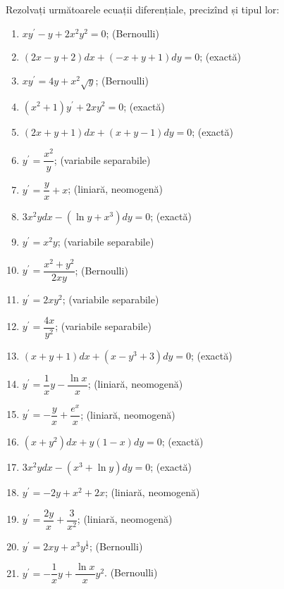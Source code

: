Rezolvați următoarele ecuații diferențiale, precizînd și tipul lor:
\begin{enumerate}[(1)]
  \item $xy^\prime - y + 2x^2 y^2 = 0 $; \hfill(Bernoulli)
  \item $(2x - y + 2) dx + (-x + y + 1) dy = 0 $; \hfill(exactă)
  \item $ xy^\prime = 4y + x^2 \sqrt{y} $; \hfill(Bernoulli)
  \item $ (x^2 + 1) y^\prime + 2xy^2 = 0 $; \hfill(exactă)
  \item $ (2x + y + 1) dx + (x + y - 1) dy = 0 $; \hfill(exactă)
  \item $ y^\prime = \dfrac{x^2}{y} $; \hfill(variabile separabile)
  \item $ y^\prime = \dfrac{y}{x} + x $; \hfill(liniară, neomogenă)
  \item $ 3x^2 y dx - (\ln y + x^3) dy = 0 $; \hfill(exactă)
  \item $ y^\prime = x^2 y $; \hfill(variabile separabile)
  \item $ y^\prime = \dfrac{x^2 + y^2}{2xy} $; \hfill(Bernoulli)
  \item $ y^\prime = 2xy^2 $; \hfill(variabile separabile)
  \item $ y^\prime = \dfrac{4x}{y^2} $; \hfill(variabile separabile)
  \item $ (x + y + 1)dx + (x - y^3 + 3) dy = 0 $; \hfill(exactă)
  \item $ y^\prime = \dfrac{1}{x}y - \dfrac{\ln x}{x} $; \hfill(liniară, neomogenă)
  \item $ y^\prime = -\dfrac{y}{x} + \dfrac{e^x}{x} $; \hfill(liniară, neomogenă)
  \item $ (x + y^2) dx + y(1 - x)dy = 0 $; \hfill(exactă)
  \item $ 3x^2 y dx - (x^3 + \ln y) dy = 0 $; \hfill(exactă)
  \item $ y^\prime = -2y + x^2 + 2x $; \hfill(liniară, neomogenă)
  \item $ y^\prime = \dfrac{2y}{x} + \dfrac{3}{x^2} $; \hfill(liniară, neomogenă)
  \item $ y^\prime = 2xy + x^3 y^{\frac{1}{2}} $; \hfill(Bernoulli)
  \item $ y^\prime = -\dfrac{1}{x}y + \dfrac{\ln x}{x} y^2 $. \hfill(Bernoulli)
\end{enumerate}


